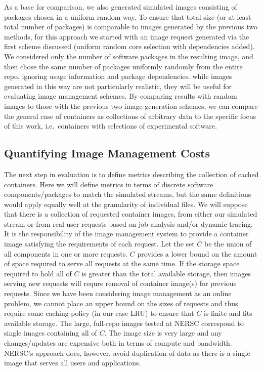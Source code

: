 \documentclass[sigconf]{acmart}
\begin{document}
As a base for comparison,
we also generated simulated images consisting of packages chosen in a uniform random way.
To ensure that total size (or at least total number of packages)
is comparable to images generated by the previous two methods,
for this approach we started with an image request generated via the first scheme discussed
(uniform random core selection with dependencies added).
We considered only the number of software packages in the resulting image,
and then chose the same number of packages uniformly randomly from the entire repo,
ignoring usage information and package dependencies.
while images generated in this way are not particularly realistic,
they will be useful for evaluating image management schemes.
By comparing results with random images to those with the previous two image generation schemes,
we can compare the general case of containers as collections of arbitrary data to the specific focus of this work,
i.e.\ containers with selections of experimental software.

\subsection{Quantifying Image Management Costs}

The next step in evaluation is to define metrics describing the collection of cached containers.
Here we will define metrics in terms of discrete software components/packages to match the simulated streams,
but the same definitions would apply equally well at the granularity of individual files.
We will suppose that there is a collection of requested container images,
from either our simulated stream or from real user requests based on job analysis and/or dynamic tracing.
It is the responsibility of the image management system to provide a container image satisfying the requirements of each request.
Let the set $C$ be the union of all components in one or more requests.
$C$ provides a lower bound on the amount of space required to serve all requests at the same time.
If the storage space required to hold all of $C$ is greater than the total available storage,
then images serving new requests will requre removal of container image(s) for previous requests.
Since we have been considering image management as an online problem,
we cannot place an upper bound on the sizes of requests and thus require some caching policy
(in our case LRU) to ensure that $C$ is finite and fits available storage.
The large, full-repo images tested at NERSC correspond to single images containing all of $C$.
The image size is very large and any changes/updates are expensive both in terms of compute and bandwidth.
NERSC's approach does, however,
avoid duplication of data as there is a single image that serves all users and applications.
\end{document}
